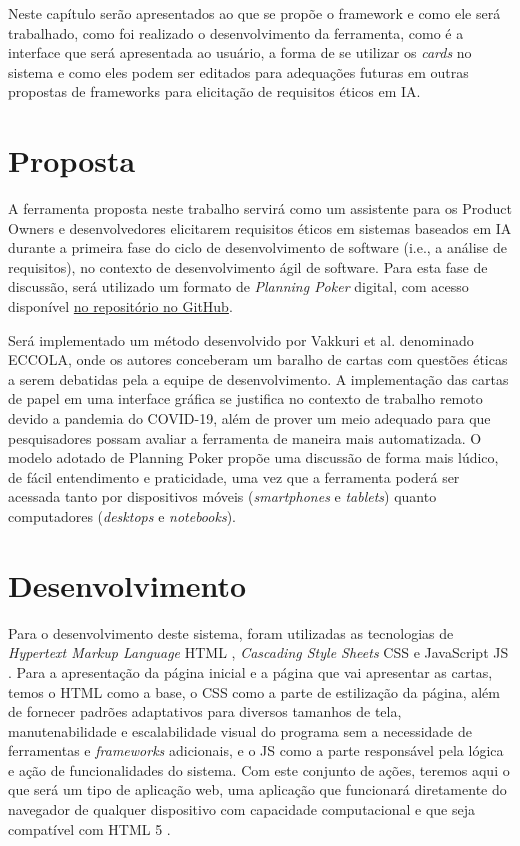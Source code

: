 \label{desenvolvimento}

Neste capítulo serão apresentados ao que se propõe o framework e como ele será trabalhado, como foi realizado o desenvolvimento da ferramenta, como é a interface que será apresentada ao usuário, a forma de se utilizar os \textit{cards} no sistema e como eles podem ser editados para adequações futuras em outras propostas de frameworks para elicitação de requisitos éticos em \acrshort{IA}.

\section{Proposta}

A ferramenta proposta neste trabalho servirá como um assistente para os Product Owners e desenvolvedores elicitarem requisitos éticos em sistemas baseados em IA durante a primeira fase do ciclo de desenvolvimento de software (i.e., a análise de requisitos), no contexto de desenvolvimento ágil de software. Para esta fase de discussão, será utilizado um formato de \textit{Planning Poker} digital, com acesso disponível \href{https://oggvaldo.GitHub.io/eccola}{no repositório no GitHub}.

Será implementado um método desenvolvido por Vakkuri et al. \cite{ECCOLA} denominado ECCOLA, onde os autores conceberam um baralho de cartas com questões éticas a serem debatidas pela a equipe de desenvolvimento. A implementação das cartas de papel em uma interface gráfica se justifica no contexto de trabalho remoto devido a pandemia do COVID-19, além de prover um meio adequado para que pesquisadores possam avaliar a ferramenta de maneira mais automatizada. O modelo adotado de Planning Poker propõe uma discussão de forma mais lúdico, de fácil entendimento e praticidade, uma vez que a ferramenta poderá ser acessada tanto por dispositivos móveis (\textit{smartphones} e \textit{tablets}) quanto computadores (\textit{desktops} e \textit{notebooks}).

\section{Desenvolvimento}

Para o desenvolvimento deste sistema, foram utilizadas as tecnologias de \textit{Hypertext Markup Language} \acrshort{HTML} \cite{HTMLsite}, \textit{Cascading Style Sheets} \acrshort{CSS} \cite{CSSsite} e JavaScript \acrshort{JS} \cite{JavaScriptsite}. Para a apresentação da página inicial e a página que vai apresentar as cartas, temos o \acrshort{HTML} como a base, o \acrshort{CSS} como a parte de estilização da página, além de fornecer padrões adaptativos para diversos tamanhos de tela, manutenabilidade e escalabilidade visual do programa sem a necessidade de ferramentas e \textit{frameworks} adicionais, e o \acrshort{JS} como a parte responsável pela lógica e ação de funcionalidades do sistema. Com este conjunto de ações, teremos aqui o que será um tipo de aplicação web, uma aplicação que funcionará diretamente do navegador de qualquer dispositivo com capacidade computacional e que seja compatível com HTML 5 \cite{webapp}.

